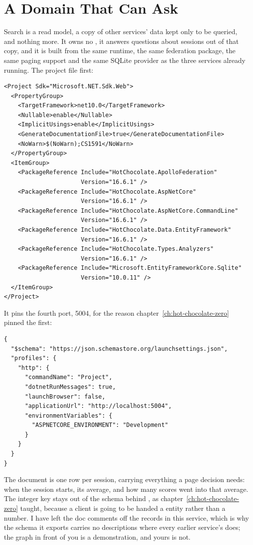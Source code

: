 \section{A Domain That Can Ask}
\label{sec:ch13-domain-that-can-ask}

%
Search is a read model, a copy of other services' data kept only to be
queried, and nothing more. It owns no , it answers questions
about sessions out of that copy, and it is built from the same runtime,
the same federation package, the same paging support and the same SQLite
provider as the three services already running. The project file first:

\begin{verbatim}
<Project Sdk="Microsoft.NET.Sdk.Web">
  <PropertyGroup>
    <TargetFramework>net10.0</TargetFramework>
    <Nullable>enable</Nullable>
    <ImplicitUsings>enable</ImplicitUsings>
    <GenerateDocumentationFile>true</GenerateDocumentationFile>
    <NoWarn>$(NoWarn);CS1591</NoWarn>
  </PropertyGroup>
  <ItemGroup>
    <PackageReference Include="HotChocolate.ApolloFederation"
                      Version="16.6.1" />
    <PackageReference Include="HotChocolate.AspNetCore"
                      Version="16.6.1" />
    <PackageReference Include="HotChocolate.AspNetCore.CommandLine"
                      Version="16.6.1" />
    <PackageReference Include="HotChocolate.Data.EntityFramework"
                      Version="16.6.1" />
    <PackageReference Include="HotChocolate.Types.Analyzers"
                      Version="16.6.1" />
    <PackageReference Include="Microsoft.EntityFrameworkCore.Sqlite"
                      Version="10.0.11" />
  </ItemGroup>
</Project>
\end{verbatim}

It pins the fourth port, 5004, for the reason
chapter~\ref{ch:hot-chocolate-zero} pinned the first:

\begin{verbatim}
{
  "$schema": "https://json.schemastore.org/launchsettings.json",
  "profiles": {
    "http": {
      "commandName": "Project",
      "dotnetRunMessages": true,
      "launchBrowser": false,
      "applicationUrl": "http://localhost:5004",
      "environmentVariables": {
        "ASPNETCORE_ENVIRONMENT": "Development"
      }
    }
  }
}
\end{verbatim}

%
The document is one row per session, carrying everything a page decision
needs: when the session starts, its average, and how many scores went into
that average. The integer key stays out of the schema behind
\code{[GraphQLIgnore]}, as chapter~\ref{ch:hot-chocolate-zero} taught, because
a client is going to be handed a  entity rather than a number.
I have left the doc comments off the records in this service, which is why
the schema it exports carries no descriptions where every earlier service's
does; the graph in front of you is a demonstration, and yours is not.

